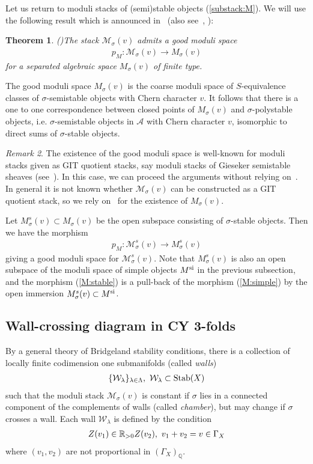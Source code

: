 \documentclass[11pt]{amsart}
\theoremstyle{plain}
\newtheorem{thm}{Theorem}[section]
\theoremstyle{definition}
\theoremstyle{remark}
\newtheorem{rmk}[thm]{Remark}
\newcommand{\aA}{\mathcal{A}}
\newcommand{\mM}{\mathcal{M}}
\newcommand{\wW}{\mathcal{W}}
\newcommand{\Stab}{\mathop{\rm Stab}\nolimits}
\begin{document}
Let us return to moduli stacks of (semi)stable 
objects (\ref{substack:M}). 
We will use the following result
which is announced in~\cite{AHLH}
(also see~\cite[Theorem~4.3]{HLK3}, \cite[Theorem~5.11]{Savvas}):
\begin{thm}\emph{(\cite{AHLH})}\label{thm:goodmoduli}
The stack $\mM_{\sigma}(v)$ admits a good moduli space
\begin{align*}
p_M \colon 
\mM_{\sigma}(v) \to M_{\sigma}(v)
\end{align*}
for a separated algebraic space $M_{\sigma}(v)$ of finite type. 
\end{thm}
The good moduli space $M_{\sigma}(v)$ is 
the coarse moduli space of $S$-equivalence classes of 
$\sigma$-semistable objects with Chern character $v$. 
It follows that there is a one to one correspondence 
between closed points of $M_{\sigma}(v)$ and 
$\sigma$-polystable objects,
i.e. $\sigma$-semistable objects 
in $\aA$ with Chern character $v$, 
isomorphic to direct sums of $\sigma$-stable 
objects. 
\begin{rmk}\label{rmk:AHHL}
The existence of the good moduli space 
is well-known for moduli stacks given as 
GIT quotient stacks, say moduli stacks of 
Gieseker semistable sheaves (see~\cite{Hu}). 
In this case, 
we can proceed the arguments without relying on~\cite{AHLH}. 
In general it is not known whether $\mM_{\sigma}(v)$ can be 
constructed as a GIT quotient stack, so 
we rely on~\cite{AHLH} for the existence of 
$M_{\sigma}(v)$. 
\end{rmk}
Let 
$M_{\sigma}^s(v) \subset M_{\sigma}(v)$
be the open subspace consisting of 
$\sigma$-stable objects. 
Then we have the morphism
\begin{align}\label{M:stable}
p_M \colon 
\mM_{\sigma}^s(v) \to M_{\sigma}^s(v)
\end{align}
giving a good moduli space for $\mM_{\sigma}^s(v)$. 
Note that $M_{\sigma}^s(v)$ is also an 
open subspace of the moduli space of 
simple objects $M^{\rm{si}}$
in the previous subsection, and the morphism 
(\ref{M:stable}) is a pull-back of the morphism (\ref{M:simple})
by the open immersion $M_{\sigma}^s(v) \subset M^{\rm{si}}$. 

\subsection{Wall-crossing diagram in CY 3-folds}\label{subsec:wallCY3}
By a general theory of Bridgeland 
stability conditions, there 
is a collection of locally finite 
codimension one submanifolds (called \textit{walls})
\begin{align}\label{wall}
\{\wW_{\lambda}\}_{\lambda \in \Lambda}, \ 
\wW_{\lambda} \subset \Stab(X)
\end{align}
such that 
the moduli stack $\mM_{\sigma}(v)$ is constant if 
$\sigma$ lies
in a connected component of 
the complements of walls (called \textit{chamber}), but may change 
if $\sigma$ crosses a wall. 
Each wall $\wW_{\lambda}$ is defined by the condition
\begin{align}\notag
Z(v_1) \in \mathbb{R}_{>0} Z(v_2), \ v_1+v_2=v
 \in \Gamma_X
\end{align}
where $(v_1, v_2)$ are not proportional
in $(\Gamma_X)_{\mathbb{Q}}$. 
\end{document}
